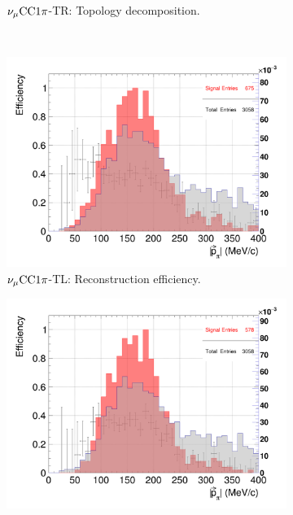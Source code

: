 \begin{figure}
\begin{subfigure}{\dbfigwid\textwidth}
                    \caption{$\nu_{\mu}\textrm{CC}1\pi$-TR: Topology decomposition.}
                    \label{subfig:stack-topo-tr}
               \end{subfigure}
               \\
               \begin{subfigure}{\dbfigwid\textwidth}
                    \includegraphics[width=\textwidth]{figures/sel/p_pi_eff_al10_TL.png}
                    \caption{$\nu_{\mu}\textrm{CC}1\pi$-TL: Reconstruction efficiency.}
                    \label{subfig:ppi-eff-tl}
               \end{subfigure}
               \begin{subfigure}{\dbfigwid\textwidth}
                    \includegraphics[width=\textwidth]{figures/sel/p_pi_eff_al9_TR.png}

\end{subfigure}
\end{figure}
